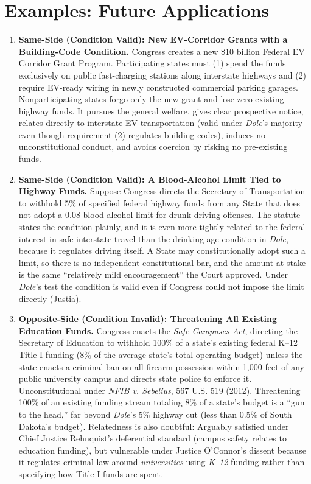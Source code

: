 \documentclass[12pt]{article}
\begin{document}
\section{Examples: Future Applications}
\begin{enumerate}

\item \textbf{Same-Side (Condition Valid): New EV-Corridor Grants with a Building-Code Condition.} Congress creates a new \$10 billion Federal EV Corridor Grant Program. Participating states must (1) spend the funds exclusively on public fast-charging stations along interstate highways and (2) require EV-ready wiring in newly constructed commercial parking garages. Nonparticipating states forgo only the new grant and lose zero existing highway funds. It pursues the general welfare, gives clear prospective notice, relates directly to interstate EV transportation (valid under \textit{Dole}'s majority even though requirement (2) regulates building codes), induces no unconstitutional conduct, and avoids coercion by risking no pre-existing funds.

\item \textbf{Same-Side (Condition Valid): A Blood-Alcohol Limit Tied to Highway Funds.} Suppose Congress directs the Secretary of Transportation to withhold 5\% of specified federal highway funds from any State that does not adopt a 0.08 blood-alcohol limit for drunk-driving offenses. The statute states the condition plainly, and it is even more tightly related to the federal interest in safe interstate travel than the drinking-age condition in \textit{Dole}, because it regulates driving itself. A State may constitutionally adopt such a limit, so there is no independent constitutional bar, and the amount at stake is the same ``relatively mild encouragement'' the Court approved. Under \textit{Dole}'s test the condition is valid even if Congress could not impose the limit directly (\href{https://supreme.justia.com/cases/federal/us/483/203/}{Justia}).

\item \textbf{Opposite-Side (Condition Invalid): Threatening All Existing Education Funds.} Congress enacts the \textit{Safe Campuses Act}, directing the Secretary of Education to withhold 100\% of a state's existing federal K--12 Title I funding (8\% of the average state's total operating budget) unless the state enacts a criminal ban on all firearm possession within 1,000 feet of any public university campus and directs state police to enforce it. Unconstitutional under \href{https://supreme.justia.com/cases/federal/us/567/519/}{\textit{NFIB v. Sebelius}, 567 U.S. 519 (2012)}. Threatening 100\% of an existing funding stream totaling 8\% of a state's budget is a ``gun to the head,'' far beyond \textit{Dole}'s 5\% highway cut (less than 0.5\% of South Dakota's budget). Relatedness is also doubtful: Arguably satisfied under Chief Justice Rehnquist's deferential standard (campus safety relates to education funding), but vulnerable under Justice O'Connor's dissent because it regulates criminal law around \textit{universities} using \textit{K--12} funding rather than specifying how Title I funds are spent.


\end{enumerate}
\end{document}

